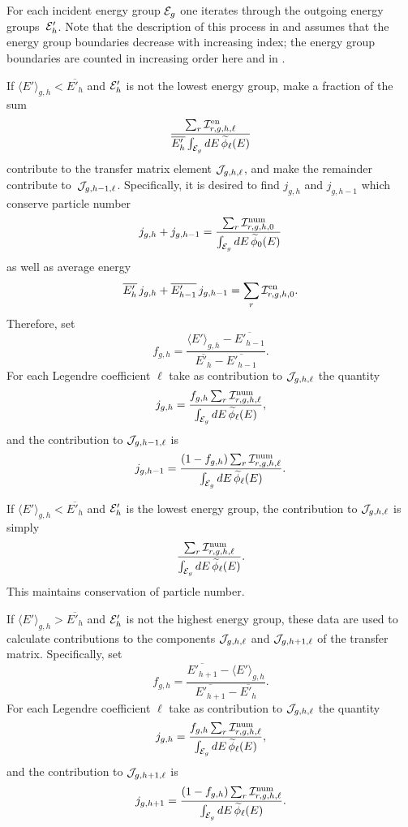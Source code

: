 For each
incident energy group ${\cal E}_g$ one iterates through the
outgoing energy groups~${\cal E}'_h$.
Note that the description of this process in
\cite{Omega} and \cite{ndfgen} assumes that the energy group
boundaries decrease with increasing index;  the energy
group boundaries are counted in increasing order here and in \xndfgen.

If $\langle E' \rangle_{g,h} < \overline {E'_h}$ and ${\cal E}'_h$
is not the lowest energy group, make a fraction of the
sum
$$
\frac{ \sum_r {\cal I}^{\text{en}}_{r,g,h,\ell} }
       { \overline {E'_h} \int_{{\cal E}_g} dE \, \widetilde \phi_\ell(E) }
$$
contribute to the transfer matrix element ${\cal J}_{g,h,\ell}$, and
make the remainder contribute to~${\cal J}_{g,h-1,\ell}$.
Specifically, it is desired to find $j_{g,h}$
and $j_{g,h-1}$ which conserve particle number
$$
  j_{g,h} + j_{g,h-1} = 
  \frac{ \sum_r {\cal I}^{\text{num}}_{r,g,h,0} }
       { \int_{{\cal E}_g} dE \, \widetilde \phi_0(E) }
$$
as well as average energy
$$
  \overline {E'_h}\, j_{g,h} + \overline {E'_{h-1}}\, j_{g,h-1} = 
    \sum_r {\cal I}^{\text{en}}_{r,g,h,0}.
$$
Therefore, set
$$
  f_{g,h} =
   \frac{ \langle E' \rangle_{g,h} - \overline {E'_{h-1}} }
    { \overline {E'_h} - \overline {E'_{h-1}} }.
$$
For each Legendre coefficient $\ell$ take as contribution to
${\cal J}_{g,h,\ell}$ the quantity
$$
  j_{g,h} = \frac{ f_{g,h} \sum_r {\cal I}^{\text{num}}_{r,g,h,\ell} }
       { \int_{{\cal E}_g} dE \, \widetilde \phi_\ell(E)  },
$$
and the contribution to ${\cal J}_{g,h-1,\ell}$ is
$$
  j_{g,h-1} = \frac{ (1 - f_{g,h}) \sum_r {\cal I}^{\text{num}}_{r,g,h,\ell} }
       { \int_{{\cal E}_g} dE \, \widetilde \phi_\ell(E) }.
$$

If $\langle E' \rangle_{g,h} < \overline {E'_h}$ and ${\cal E}'_h$
is the lowest energy group, the contribution to ${\cal J}_{g,h,\ell}$
is simply
$$
  \frac{ \sum_r {\cal I}^{\text{num}}_{r,g,h,\ell} }
       { \int_{{\cal E}_g} dE \, \widetilde \phi_\ell(E) }.
$$
This maintains conservation of particle number.

If $\langle E' \rangle_{g,h} > \overline {E'_h}$ and ${\cal E}'_h$
is not the highest energy group, these data are used to calculate
contributions to the components ${\cal J}_{g,h,\ell}$ and ${\cal J}_{g,h+1,\ell}$
of the transfer matrix.  Specifically, set
$$
  f_{g,h} =
   \frac{ \overline {E'_{h+1}} - \langle E' \rangle_{g,h} }
    { \overline {E'_{h+1}} - \overline {E'_h }}.
$$
For each Legendre coefficient $\ell$ take as contribution to
${\cal J}_{g,h,\ell}$ the quantity
$$
  j_{g,h} = \frac{ f_{g,h} \sum_r {\cal I}^{\text{num}}_{r,g,h,\ell} }
       { \int_{{\cal E}_g} dE \, \widetilde \phi_\ell(E) },
$$
and the contribution to ${\cal J}_{g,h+1,\ell}$ is
$$
  j_{g,h+1} = \frac{ (1 - f_{g,h}) \sum_r {\cal I}^{\text{num}}_{r,g,h,\ell} }
       { \int_{{\cal E}_g} dE \, \widetilde \phi_\ell(E) }.
$$

